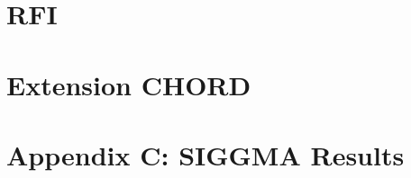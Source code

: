 \newpage
\pagestyle{headings}

\begin{appendices}
\addappheadtotoc %
\appendixpage %


\label{sec:appendices}
\chapter{RFI}

\chapter{Extension CHORD}

\chapter{Appendix C: SIGGMA Results}


\end{appendices}